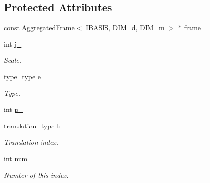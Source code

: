\subsection*{Protected Attributes}
\begin{CompactItemize}
\item 
const \hyperlink{classFrameTL_1_1AggregatedFrame}{AggregatedFrame}$<$ IBASIS, DIM\_\-d, DIM\_\-m $>$ $\ast$ \hyperlink{classFrameTL_1_1FrameIndex_93c3120c2ff5468dcfb8af0dfe53efd3}{frame\_\-}
\item 
\hypertarget{classFrameTL_1_1FrameIndex_6683a6572d3331a01cf8ef137953901c}{
int \hyperlink{classFrameTL_1_1FrameIndex_6683a6572d3331a01cf8ef137953901c}{j\_\-}}
\label{classFrameTL_1_1FrameIndex_6683a6572d3331a01cf8ef137953901c}

\begin{CompactList}\small\item\em Scale. \item\end{CompactList}\item 
\hypertarget{classFrameTL_1_1FrameIndex_36434326be4b99ca17309d5f5c09f15b}{
\hyperlink{classFrameTL_1_1FrameIndex_e92c4f89e747a61eb2f7275d0bd01e25}{type\_\-type} \hyperlink{classFrameTL_1_1FrameIndex_36434326be4b99ca17309d5f5c09f15b}{e\_\-}}
\label{classFrameTL_1_1FrameIndex_36434326be4b99ca17309d5f5c09f15b}

\begin{CompactList}\small\item\em Type. \item\end{CompactList}\item 
int \hyperlink{classFrameTL_1_1FrameIndex_570736897b9ce68ba01a9feccbc5ffc9}{p\_\-}
\item 
\hypertarget{classFrameTL_1_1FrameIndex_664f72dc92e69b08504ce3cced10732b}{
\hyperlink{classFrameTL_1_1FrameIndex_222e44072cf0330c11cd157d4a1ff6a1}{translation\_\-type} \hyperlink{classFrameTL_1_1FrameIndex_664f72dc92e69b08504ce3cced10732b}{k\_\-}}
\label{classFrameTL_1_1FrameIndex_664f72dc92e69b08504ce3cced10732b}

\begin{CompactList}\small\item\em Translation index. \item\end{CompactList}\item 
\hypertarget{classFrameTL_1_1FrameIndex_d7451c14abbd73b8d80ba9e2ab779a3b}{
int \hyperlink{classFrameTL_1_1FrameIndex_d7451c14abbd73b8d80ba9e2ab779a3b}{num\_\-}}
\label{classFrameTL_1_1FrameIndex_d7451c14abbd73b8d80ba9e2ab779a3b}

\begin{CompactList}\small\item\em Number of this index. \item\end{CompactList}\end{CompactItemize}


